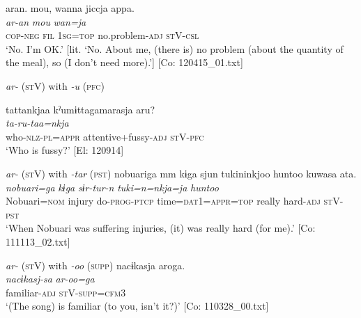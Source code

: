 \ex \label{ex:9.45d} %
 \glll  aran.  {\textbar}mou{\textbar},  wanna  jiccja  appa.\\
      \textit{ar-an}  \textit{mou}  \textit{wan=ja}  \textit{}  \textit{}\\
      \textsc{cop}-\textsc{neg}  \textsc{fil}  1\textsc{sg}=\textsc{top}  no.problem-\textsc{adj}  \textsc{st}V-\textsc{csl}\\
      \glt       ‘No. I’m OK.’ [lit. ‘No. About me, (there is) no problem (about the quantity of the meal), so (I don’t need more).’] [Co: 120415\_01.txt]

\exi{} \textit{ar-} (\textsc{st}V) with \textit{{}-u} (\textsc{pfc})

\ex \label{ex:9.45e} %
 \glll  tattankjaa  kˀumɨttagamarasja  aru?\\
      \textit{ta-ru-taa=nkja}  \textit{}  \textit{}\\
      who-\textsc{nlz}-\textsc{pl}=\textsc{appr}  attentive+fussy-\textsc{adj}  \textsc{st}V-\textsc{pfc}\\
      \glt       ‘Who is fussy?’ [El: 120914]

\exi{}  \textit{ar-} (\textsc{st}V) with \textit{{}-tar} (\textsc{pst})
\ex
\glll   nobuariga  mm  kɨga  sjun  tukininkjoo  huntoo  kuwasa  ata.\\
      \textit{nobuari=ga}    \textit{kɨga}  \textit{sɨr-tur-n}  \textit{tuki=n=nkja=ja}  \textit{huntoo}  \textit{}  \textit{}\\
      Nobuari=\textsc{nom}    injury  do-\textsc{prog}-\textsc{ptcp}  time=\textsc{dat}1=\textsc{appr}=\textsc{top}  really  hard-\textsc{adj}  \textsc{st}V-\textsc{pst}\\
      \glt       ‘When Nobuari was suffering injuries, (it) was really hard (for me).’ [Co: 111113\_02.txt]

\exi{}  \textit{ar-} (\textsc{st}V) with \textit{{}-oo} (\textsc{supp})
\ex
\glll     nacɨkasja  aroga.\footnotemark\\
      \textit{nacɨkasj-sa}  \textit{ar-oo=ga}\\
      familiar-\textsc{adj}  \textsc{st}V-\textsc{supp}=\textsc{cfm}3\\
      \glt       ‘(The song) is familiar (to you, isn’t it?)’ [Co: 110328\_00.txt]
    \z
\z{}

